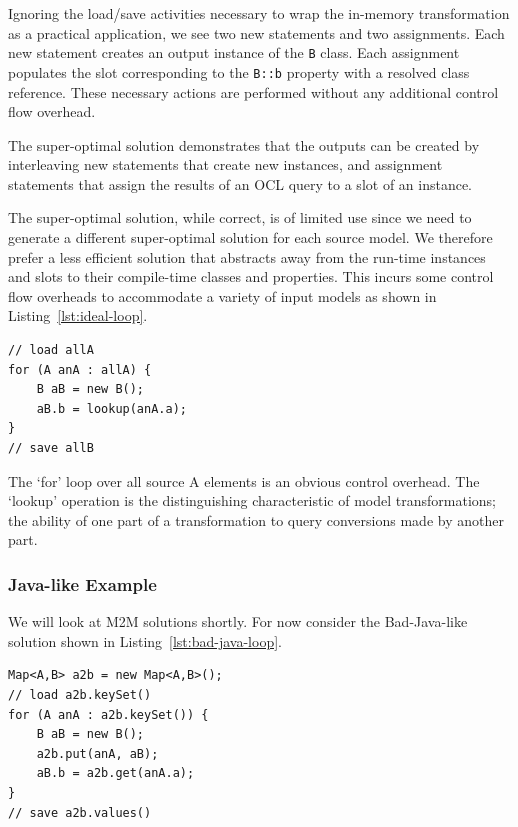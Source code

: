 \documentclass{jot}
\begin{document}
Ignoring the load/save activities necessary to wrap the in-memory transformation as a practical application, we see two new statements and two assignments. Each new statement creates an output instance of the \verb|B| class. Each assignment populates the slot corresponding to the \verb|B::b| property with a resolved class reference. These necessary actions are performed without any additional control flow overhead.

The super-optimal solution demonstrates that the outputs can be created by interleaving new statements that create new instances, and assignment statements that assign the results of an OCL query to a slot of an instance.

The super-optimal solution, while correct, is of limited use since we need to generate a different super-optimal solution for each source model. We therefore prefer a less efficient solution that abstracts away from the run-time instances and slots to their compile-time classes and properties. This incurs some control flow overheads to accommodate a variety of input models as shown in Listing~\ref{lst:ideal-loop}.

\begin{lstlisting}[label=lst:ideal-loop,caption=Idealized Example Conversion Loop,captionpos=b]
// load allA
for (A anA : allA) {
    B aB = new B();
    aB.b = lookup(anA.a);
}
// save allB
\end{lstlisting}

The `for' loop over all source A elements is an obvious control overhead. The `lookup' operation is the distinguishing characteristic of model transformations; the ability of one part of a transformation to query conversions made by another part. 

\subsubsection{Java-like Example}

We will look at M2M solutions shortly. For now consider the Bad-Java-like solution shown in Listing~\ref{lst:bad-java-loop}.

\begin{lstlisting}[label=lst:bad-java-loop,caption=Bad-Java-like Example Conversion Loop,captionpos=b]
Map<A,B> a2b = new Map<A,B>();
// load a2b.keySet()
for (A anA : a2b.keySet()) {
    B aB = new B();
    a2b.put(anA, aB);
    aB.b = a2b.get(anA.a);
}
// save a2b.values()
\end{lstlisting}
\end{document}
